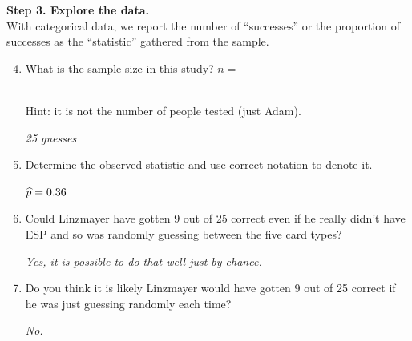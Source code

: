 {\bf Step 3. Explore the data. }\\
With categorical data, we  report the number of ``successes''
or the proportion of successes as the ``statistic'' gathered from the
sample.  
 \begin{enumerate}
   \setcounter{enumi}{3}
   \item   What is the sample size in this study?  $n = $ 
\begin{students}
  \vspace{1cm}\\
  Hint: it is not the number of people tested (just Adam).
\end{students}

\begin{key}
{\it 25 guesses}
\end{key}

   \item  Determine the observed statistic and use correct notation to
     denote it. 
\begin{students}
  \vspace{1cm}
\end{students}

\begin{key}
 $\widehat{p} = 0.36$
\end{key}

   \item  Could Linzmayer have gotten 9 out of 25 correct even if he
     really didn't have ESP and so was randomly guessing between the
     five card types? 
\begin{students}
  \vspace{1cm}
\end{students}

\begin{key}
{\it Yes, it is possible to do that well just by chance.}
\end{key}

   \item  Do you think it is likely Linzmayer would have gotten 9 out of 25
     correct if he was just guessing randomly each time?  
\begin{students}
  \vspace{1cm}
\end{students}

\begin{key}
{\it No.}
\end{key}

   \end{enumerate}
   
